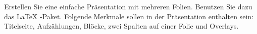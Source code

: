Erstellen Sie eine einfache Präsentation mit mehreren Folien. Benutzen Sie dazu das \LaTeX{} -Paket. Folgende Merkmale sollen in der Präsentation enthalten sein: Titelseite, Aufzählungen, Blöcke, zwei Spalten auf einer Folie und Overlays.